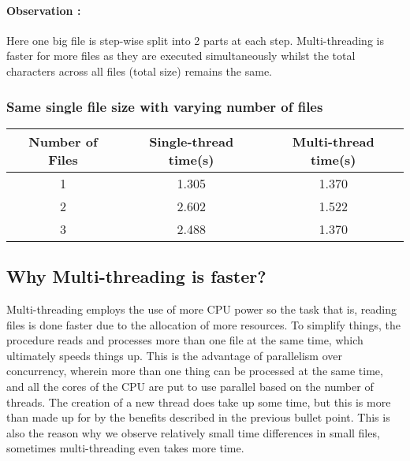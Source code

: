 \documentclass{article}
\begin{document}
\paragraph{Observation :}Here one big file is step-wise split into 2 parts at each step. Multi-threading is faster for more files as they are executed simultaneously whilst the total characters across all files (total size) remains the same.

\subsubsection{Same single file size with varying number of files}
\begin{tabular}{|c|c|c|}
\hline
 Number of Files & Single-thread time(s) & Multi-thread time(s) \\
\hline
 1 & 1.305 & 1.370 \\
\hline
 2 & 2.602& 1.522 \\
\hline
 3 & 2.488 & 1.370 \\
\hline

\end{tabular}


\subsection{Why Multi-threading is faster?}

Multi-threading employs the use of more CPU power so the task that is, reading files is done faster due to the allocation of more resources. To simplify things, the procedure reads and processes more than one file at the same time, which ultimately speeds things up. This is the advantage of parallelism over concurrency, wherein more than one thing can be processed at the same time, and all the cores of the CPU are put to use parallel based on the number of threads. The creation of a new thread does take up some time, but this is more than made up for by the benefits described in the previous bullet point. This is also the reason why we observe relatively small time differences in small files, sometimes multi-threading even takes more time.
\end{document}
